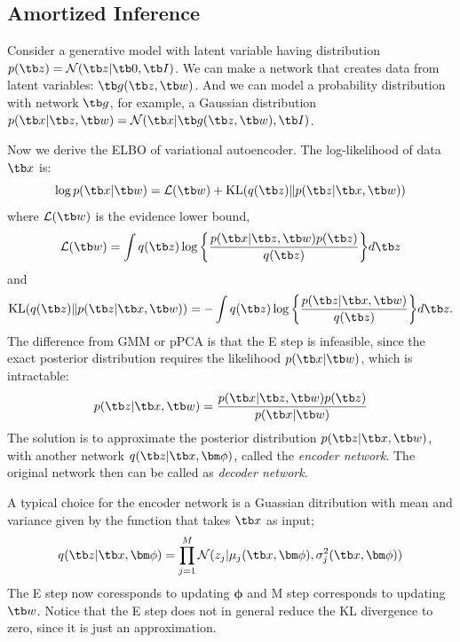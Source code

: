 \documentclass{article}
\begin{document}
    \subsection{Amortized Inference}
        Consider a generative model with latent variable having distribution $p(\tb z)=\mathcal{N}(\tb z|\tb 0, \tb I)$.
        We can make a network that creates data from latent variables: $\tb g(\tb z,\tb w)$. And we can model a probability distribution with network $\tb g$,
        for example, a Gaussian distribution $p(\tb x|\tb z, \tb w) = \mathcal{N}(\tb x|\tb g(\tb z,\tb w), \tb I)$.
        
        Now we derive the ELBO of variational autoencoder.
        The log-likelihood of data $\tb x$ is:
        \[
        \log{p(\tb x| \tb w)=\mathcal{L}(\tb w)+\text{KL}(q(\tb z )\|p(\tb z|\tb x, \tb w))}
        \]
        where $\mathcal{L}(\tb w)$ is the evidence lower bound,
        \[
        \mathcal{L}(\tb w)=\int q(\tb z)\log{\left\{\frac{p(\tb x|\tb z, \tb w)p(\tb z)}{q(\tb z)}\right\}}d\tb z
        \]
        and
        \[
        \text{KL}(q(\tb z) \| p(\tb z|\tb x,\tb w))=-\int q(\tb z)\log{\left\{ \frac{p(\tb z|\tb x,\tb w)}{q(\tb z)} \right\}}d\tb z.
        \]
        The difference from GMM or pPCA is that the E step is infeasible, since the exact posterior distribution requires the
        likelihood $p(\tb x|\tb w)$, which is intractable:
        \[
        p(\tb z|\tb x, \tb w)=\frac{p(\tb x|\tb z, \tb w)p(\tb z)}{p(\tb x|\tb w)}
        \]
        The solution is to approximate the posterior distribution $p(\tb z|\tb x, \tb w)$,
        with another network $q(\tb z|\tb x, \bm\phi)$, called the \emph{encoder network}.
        The original network then can be called as \emph{decoder network}.

        A typical choice for the encoder network is a Guassian ditribution with mean and variance given by the function that takes $\tb x$ as input;
        \[
        q(\tb z|\tb x,\bm\phi)=\prod_{j=1}^{M}\mathcal{N}(z_j|\mu_j(\tb x,\bm\phi), \sigma^2_j(\tb x,\bm\phi))
        \]
        The E step now coressponds to updating $\bm\phi$ and M step corresponds to updating $\tb w$. Notice that the E step does not in general reduce the
        KL divergence to zero, since it is just an approximation.
\end{document}
